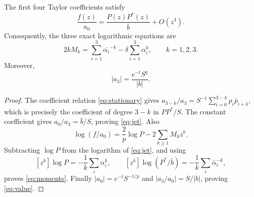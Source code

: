 \begin{lemma}
The first four Taylor coefficients satisfy
\begin{equation}\label{eq:jet}
 \frac{f(z)}{a_0}=\frac{P(z)P^*(z)}{\overline b}+O(z^4).
\end{equation}
Consequently, the three exact logarithmic equations are
\begin{equation}\label{eq:moments}
 2k M_k=\sum_{i=1}^3\overline{\alpha_i}^{-k}
                  -\delta\sum_{i=1}^3\alpha_i^k,
 \qquad k=1,2,3.
\end{equation}
Moreover,
\begin{equation}\label{eq:value}
 |a_3|=\frac{e^{-t}S^q}{|b|}.
\end{equation}
\end{lemma}
\begin{proof}
The coefficient relation \eqref{eq:stationary} gives
$a_{3-k}/a_3=S^{-1}\sum_{i=0}^{3-k}p_i\bar p_{i+k}$, which is precisely
the coefficient of degree $3-k$ in $PP^*/S$.
The constant coefficient gives $a_0/a_3=\bar b/S$, proving \eqref{eq:jet}.
Also
\[
 \log(f/a_0)=\frac2p\log P-2\sum_{k\geq1}M_k z^k.
\]
Subtracting $\log P$ from the logarithm of \eqref{eq:jet}, and using
\[
 [z^k]\log P=-\frac1k\sum_i\alpha_i^k,
 \qquad
 [z^k]\log(P^*/\bar b)=-\frac1k\sum_i\bar\alpha_i^{-k},
\]
proves \eqref{eq:moments}. Finally $|a_0|=e^{-t}S^{-1/p}$ and
$|a_3/a_0|=S/|b|$, proving \eqref{eq:value}.
\end{proof}

